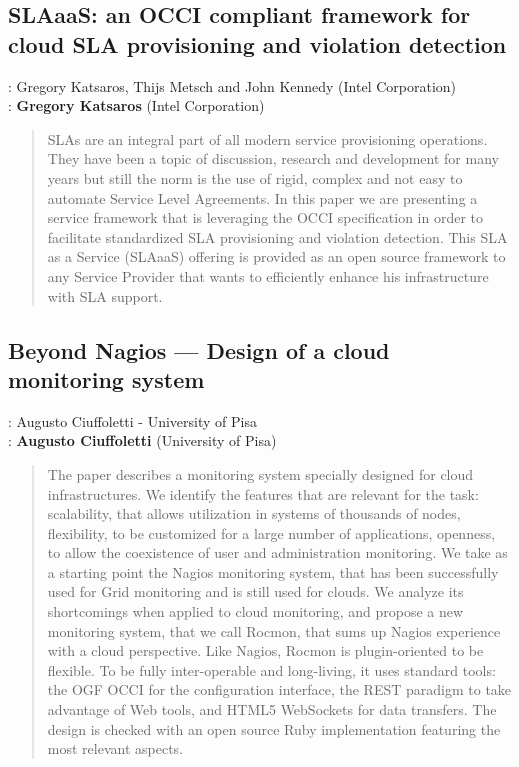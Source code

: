 \documentclass[10pt,a4paper]{article}
\begin{document}
\subsection*{SLAaaS: an OCCI compliant framework for cloud SLA provisioning and violation detection}

: Gregory Katsaros, Thijs Metsch and John Kennedy (Intel Corporation)\\
: {\bf Gregory Katsaros} (Intel Corporation)

\begin{quote}
	SLAs are an integral part of all modern service provisioning operations. They have been a topic of discussion, research and
	development for many years but still the norm is the use of rigid, complex and not easy to automate Service Level Agreements.
	In this paper we are presenting a service framework that is leveraging the OCCI specification in order to facilitate standardized
	SLA provisioning and violation detection. This SLA as a Service (SLAaaS) offering is provided as an open source framework to
	any Service Provider that wants to efficiently enhance his infrastructure with SLA support.
\end{quote}
\subsection*{Beyond Nagios --- Design of a cloud monitoring system}

: Augusto Ciuffoletti - University of Pisa\\
: {\bf Augusto Ciuffoletti} (University of Pisa)

\begin{quote}
	The paper describes a monitoring system specially designed for cloud infrastructures. We identify the features
	that are relevant for the task: scalability, that allows utilization in systems of thousands of nodes, flexibility, to
	be customized for a large number of applications, openness, to allow the coexistence of user and administration
	monitoring. We take as a starting point the Nagios monitoring system, that has been successfully used for
	Grid monitoring and is still used for clouds. We analyze its shortcomings when applied to cloud monitoring,
	and propose a new monitoring system, that we call Rocmon, that sums up Nagios experience with a cloud
	perspective. Like Nagios, Rocmon is plugin-oriented to be flexible. To be fully inter-operable and long-living,
	it uses standard tools: the OGF OCCI for the configuration interface, the REST paradigm to take advantage
	of Web tools, and HTML5 WebSockets for data transfers. The design is checked with an open source Ruby
	implementation featuring the most relevant aspects.
\end{quote}
\end{document}
